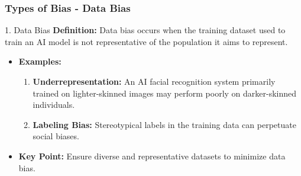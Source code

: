 \documentclass{beamer}
\begin{document}
\begin{frame}[fragile]
    \frametitle{Types of Bias - Data Bias}
    \begin{block}{1. Data Bias}
        \textbf{Definition:} Data bias occurs when the training dataset used to train an AI model is not representative of the population it aims to represent.

        \begin{itemize}
            \item \textbf{Examples:}
            \begin{enumerate}
                \item \textbf{Underrepresentation:} An AI facial recognition system primarily trained on lighter-skinned images may perform poorly on darker-skinned individuals.
                \item \textbf{Labeling Bias:} Stereotypical labels in the training data can perpetuate social biases.
            \end{enumerate}
            \item \textbf{Key Point:} Ensure diverse and representative datasets to minimize data bias.
        \end{itemize}
    \end{block}
\end{frame}
\end{document}
